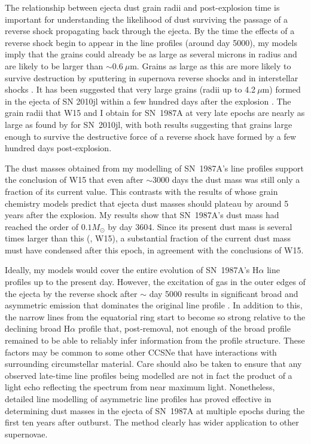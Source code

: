 The relationship between ejecta dust grain radii and post-explosion 
time is important for understanding the likelihood of dust surviving the 
passage of a reverse shock propagating back through the ejecta. By the 
time the effects of a reverse shock begin to appear in the line profiles 
(around day 5000), my models imply that the grains could already be as 
large as several microns in radius and are likely to be larger than $\sim 
0.6~\mu$m. Grains as large as this are more likely to survive destruction 
by sputtering in supernova reverse shocks and in interstellar shocks 
\citep{Silvia2010, Silvia2012, Slavin2015}.
It has been suggested that very large grains (radii up to 4.2$~\mu$m) 
formed in the ejecta of SN 2010jl within a few hundred days after the 
explosion \cite{Gall2014}. The grain radii that W15 and I obtain 
for SN~1987A at very late epochs are nearly as large as found by 
\citet{Gall2014} for SN~2010jl, with both results suggesting that grains 
large enough to survive the destructive force of a reverse shock have 
formed by a few hundred days post-explosion. 

The dust masses obtained from my modelling of SN~1987A's line profiles 
support the conclusion of W15 that even after $\sim$3000 days the dust 
mass was still only a fraction of its current value. This contrasts with 
the results of \citet{Sarangi2015} whose grain chemistry models predict 
that ejecta dust masses should plateau by around 5 years after the 
explosion. My results show that SN~1987A's dust mass had reached 
the order of $0.1M_{\odot}$ by day 3604.  Since its present dust mass is 
several times larger than this (\citet{Matsuura2015}, W15), a 
substantial fraction of the current dust mass must have condensed after 
this epoch, in agreement with the conclusions of W15.

Ideally, my models would cover the entire evolution of SN~1987A's 
H$\alpha$ line profiles up to the present day.  However, the excitation of 
gas in the outer edges of the ejecta by the reverse shock after $\sim$ day 
5000 results in significant broad and asymmetric emission that 
dominates the original line profile \citep{Fransson2013}.  In addition to 
this, the narrow lines from the equatorial ring start to become so 
strong relative to the declining broad H$\alpha$ profile that, 
post-removal, not enough of the broad profile remained to be 
able to reliably infer information from the profile structure. These 
factors may be 
common to some other CCSNe that have interactions with surrounding 
circumstellar material. Care should also be taken to ensure that any 
observed late-time line profiles being modelled are not in fact the 
product of a light echo reflecting the spectrum from near maximum light. 
Nonetheless, detailed line modelling of asymmetric line profiles has 
proved effective in determining dust masses in the ejecta of SN~1987A at 
multiple epochs during the first ten years after outburst. The method 
clearly has wider application to other supernovae.


